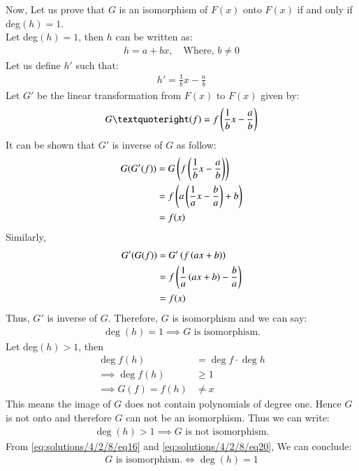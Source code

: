 Now, Let us prove that $G$ is an isomorphism of $F(x)$ onto $F(x)$ if and only if deg$(h)=1$. \\
Let deg$(h)=1$, then $h$ can be written as:
\begin{align}
    h=a+bx, \quad \text{Where, }b \ne 0
\end{align}
Let us define $h'$ such that:
\begin{align}
    h'=\frac1bx-\frac ab
\end{align}
Let $G'$ be the linear transformation from $F(x)$ to $F(x)$ given by:
\begin{align}
    G’(f)=f\brak{\frac1bx-\frac ab}
\end{align}
It can be shown that $G'$ is inverse of $G$ as follow:
\begin{align}
    G(G'(f))&=G\left(f\left(\frac1bx-\frac ab\right)\right)\\
    &=f\left(a\left(\frac1ax-\frac ba\right)+b\right)\\
    &=f(x)
\end{align}
Similarly, 
\begin{align}
    G'(G(f))&=G'\left(f\left(ax+b\right)\right)\\
    &=f\left(\frac1a\left(ax+b\right)-\frac ba\right)\\
    &=f(x)
\end{align}
Thus, $G'$ is inverse of $G$. Therefore, $G$ is isomorphism and we can say: 
\begin{align}
    \boxed{\deg(h)=1 \implies \text{$G$ is isomorphism.}} \label{eq:solutions/4/2/8/eq16}
\end{align}
Let deg$(h)>1$, then 
\begin{align}
    \deg f(h)&=\deg f\cdot \deg h \\
    \implies \deg f(h)&\geq 1\\
    \implies G(f)=f(h) &\ne x
\end{align}
This means the image of $G$ does not contain polynomials of degree one. Hence $G$ is not onto and therefore $G$ can not be an isomorphism. Thus we can write:
\begin{align}
    \boxed{\deg(h)>1 \implies \text{$G$ is not isomorphism.}} \label{eq:solutions/4/2/8/eq20} 
\end{align}
From \eqref{eq:solutions/4/2/8/eq16} and \eqref{eq:solutions/4/2/8/eq20}, We can conclude:
\begin{align}
    \boxed{\text{$G$ is isomorphism.} \iff \deg(h)=1}  
\end{align}
